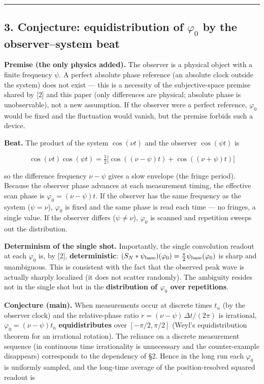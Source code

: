 \documentclass[
]{ltjsarticle}
\begin{document}
\begin{center}\rule{0.5\linewidth}{0.5pt}\end{center}

\subsection{\texorpdfstring{3. Conjecture: equidistribution of
\(\varphi_0\) by the observer--system
beat}{3. Conjecture: equidistribution of \textbackslash varphi\_0 by the observer--system beat}}\label{conjecture-equidistribution-of-varphi_0-by-the-observersystem-beat}

\textbf{Premise (the only physics added).} The observer is a physical
object with a finite frequency \(\psi\). A perfect absolute phase
reference (an absolute clock outside the system) does not exist --- this
is a necessity of the subjective-space premise shared by {[}2{]} and
this paper (only differences are physical; absolute phase is
unobservable), not a new assumption. If the observer were a perfect
reference, \(\varphi_0\) would be fixed and the fluctuation would
vanish, but the premise forbids such a device.

\textbf{Beat.} The product of the system \(\cos(\nu t)\) and the
observer \(\cos(\psi t)\) is

\[
\cos(\nu t)\cos(\psi t)=\tfrac12\big[\cos((\nu-\psi)t)+\cos((\nu+\psi)t)\big]
\]

so the difference frequency \(\nu-\psi\) gives a slow envelope (the
fringe period). Because the observer phase advances at each measurement
timing, the effective scan phase is \(\varphi_0=(\nu-\psi)t\). If the
observer has the same frequency as the system (\(\psi=\nu\)),
\(\varphi_0\) is fixed and the same phase is read each time --- no
fringes, a single value. If the observer differs (\(\psi\ne\nu\)),
\(\varphi_0\) is scanned and repetition sweeps out the distribution.

\textbf{Determinism of the single shot.} Importantly, the single
convolution readout at each \(\varphi_0\) is, by {[}2{]},
\textbf{deterministic}:
\((S_N*\psi_{\rm base})(\varphi_0)=\tfrac{\pi}{2}\psi_{\rm base}(\varphi_0)\)
is sharp and unambiguous. This is consistent with the fact that the
observed peak wave is actually sharply localized (it does not scatter
randomly). The ambiguity resides not in the single shot but in the
\textbf{distribution of \(\varphi_0\) over repetitions}.

\textbf{Conjecture (main).} When measurements occur at discrete times
\(t_n\) (by the observer clock) and the relative-phase ratio
\(r=(\nu-\psi)\,\Delta t/(2\pi)\) is irrational,
\(\varphi_0=(\nu-\psi)t_n\) \textbf{equidistributes} over
\([-\pi/2,\pi/2]\) (Weyl's equidistribution theorem for an irrational
rotation). The reliance on a discrete measurement sequence (in
continuous time irrationality is unnecessary and the counter-example
disappears) corresponds to the dependency of §2. Hence in the long run
each \(\varphi_0\) is uniformly sampled, and the long-time average of
the position-resolved squared readout is
\end{document}
